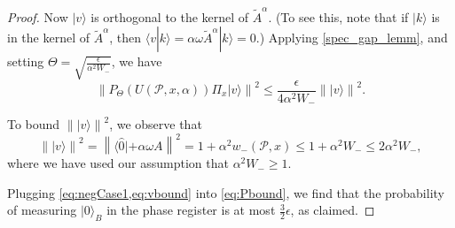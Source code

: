 \documentclass[cleveref, autoref, thm-restate,11pt]{article}
\theoremstyle{definition}
\newcommand{\sop}[1]{{\mathcal #1}}
\newcommand{\ket}[1]{|#1\rangle}
\newcommand{\bra}[1]{\langle#1|}
\newcommand{\braket}[2]{\langle{#1}|{#2}\rangle}
\newcommand{\U}[3]{{U({#1},{#2},{#3})}}
\newcommand{\wm}[2]{{w_-({#1},{#2})}}
\newcommand{\Aa}[1]{{\tilde{A}^{#1}}}
\newcommand{\PtHx}{\Pi_{x}}
\begin{document}
\begin{proof}
Now $\ket{v}$ is orthogonal to the kernel of $\Aa{\alpha}$. (To see this, note that if $\ket{k}$ is in the kernel of $\Aa{\alpha}$, then $\braket{v}{k}=\alpha\omega \Aa{\alpha}\ket{k}=0$.)
Applying \cref{spec_gap_lemm}, and setting
$\Theta=\sqrt{\frac{\epsilon}{\alpha^2 W_-}}$, we have
\begin{equation}\label{eq:negCase1}
\left\|P_{\Theta}(\U{\sop P}{x}{\alpha})\PtHx\ket{v}\right\|^2\leq\frac{\epsilon}{4\alpha^2 W_-}\left\|\ket{v}\right\|^2.
\end{equation}

To bound $\left\|\ket{v}\right\|^2$, we observe that 
\begin{equation}\label{eq:vbound}
\left\|\ket{v}\right\|^2=\left\|\bra{\hat{0}}+\alpha\omega A\right\|^2= 1+\alpha^2\wm{\sop P}{x}\leq 
1+\alpha^2W_-\leq2\alpha^2W_-,
\end{equation}
where we have used our assumption that $\alpha^2W_-\geq 1$.


Plugging \cref{eq:negCase1,eq:vbound} into \cref{eq:Pbound}, we find that the
probability of measuring $\ket{0}_B$ in the phase register  is at most
$\frac{3}{2}\epsilon$, as claimed.
\end{proof}
\end{document}
